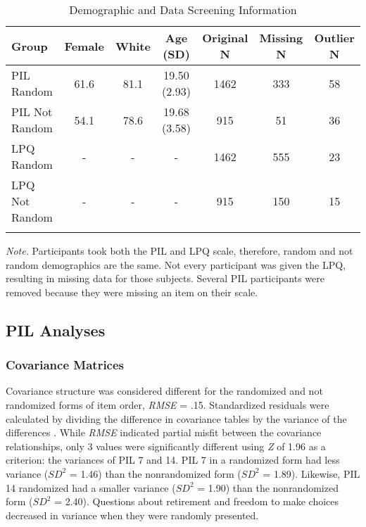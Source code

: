 \documentclass[english,man, mask]{apa6}
\theoremstyle{definition}
\theoremstyle{definition}
\theoremstyle{definition}
\theoremstyle{remark}
\begin{document}
\begin{table}[tbp]
\begin{center}
\begin{threeparttable}
\caption{\label{tab:demo-table}Demographic and Data Screening Information}
\begin{tabular}{lcccccc}
\toprule
Group & \multicolumn{1}{c}{Female} & \multicolumn{1}{c}{White} & \multicolumn{1}{c}{Age (SD)} & \multicolumn{1}{c}{Original N} & \multicolumn{1}{c}{Missing N} & \multicolumn{1}{c}{Outlier N}\\
\midrule
PIL Random & 61.6 & 81.1 & 19.50 (2.93) & 1462 & 333 & 58\\
PIL Not Random & 54.1 & 78.6 & 19.68 (3.58) & 915 & 51 & 36\\
LPQ Random & - & - & - & 1462 & 555 & 23\\
LPQ Not Random & - & - & - & 915 & 150 & 15\\
\bottomrule
\addlinespace
\end{tabular}
\begin{tablenotes}[para]
\textit{Note.} Participants took both the PIL and LPQ scale, therefore, random and not random demographics are the same. Not every participant was given the LPQ, resulting in missing data for those subjects. Several PIL participants were removed because they were missing an item on their scale.
\end{tablenotes}
\end{threeparttable}
\end{center}
\end{table}

\subsection{PIL Analyses}\label{pil-analyses}

\subsubsection{Covariance Matrices}\label{covariance-matrices}

Covariance structure was considered different \autocite[i.e.~above
.10;][]{Hu1999} for the randomized and not randomized forms of item
order, \emph{RMSE} = .15. Standardized residuals were calculated by
dividing the difference in covariance tables by the variance of the
differences \autocite{Hausman1978}. While \emph{RMSE} indicated partial
misfit between the covariance relationships, only 3 values were
significantly different using \emph{Z} of 1.96 as a criterion: the
variances of PIL 7 and 14. PIL 7 in a randomized form had less variance
(\(SD^2\) = 1.46) than the nonrandomized form (\(SD^2\) = 1.89).
Likewise, PIL 14 randomized had a smaller variance (\(SD^2\) = 1.90)
than the nonrandomized form (\(SD^2\) = 2.40). Questions about
retirement and freedom to make choices decreased in variance when they
were randomly presented.
\end{document}
